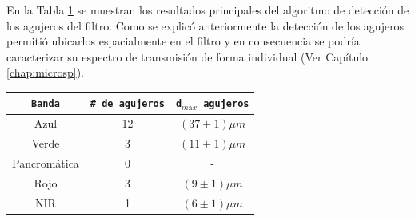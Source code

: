 \hspace{0.5cm} En la Tabla \ref{tabaguj} se muestran los resultados principales del algoritmo de detección de los agujeros del filtro. Como se explicó anteriormente la detección de los agujeros permitió ubicarlos espacialmente en el filtro y en consecuencia se podría caracterizar su espectro de transmisión de forma individual (Ver Capítulo \ref{chap:microsp}).

\begin{table}[H]
\begin{center}
\begin{tabular}{ |c|c|c|}    \toprule
\texttt{Banda} & \texttt{\# de agujeros} & \texttt{d$_{máx}$ agujeros} \\\midrule
\rowcolor{blue!15} Azul   & 12  & $(37 \pm 1) \mu m$  \\ 
\rowcolor{green!50} Verde  & 3 & $(11 \pm 1) \mu m$ \\ 
Pancromática & 0 & - \\
\rowcolor{red!50} Rojo  & 3 & $(9 \pm 1) \mu m$ \\
\rowcolor{maroon!20} NIR   & 1 & $(6 \pm 1) \mu m$ \\
\bottomrule
 \hline
\end{tabular}
\end{center}
 \label{tabaguj}
\end{table}

